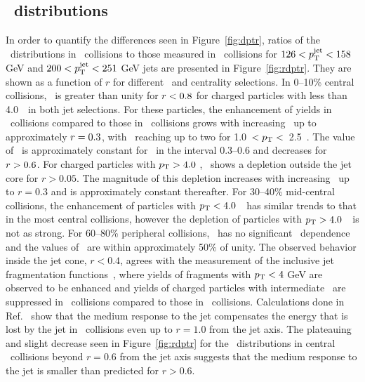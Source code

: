 \subsection{\RDptr\ distributions}
\label{sec:rdptr}
In order to quantify the differences seen in Figure~\ref{fig:dptr}, ratios of the \Dptr\ distributions in \pbpb\ collisions to those measured in \pp\ collisions for $126 < \mbox{$p_{\mathrm{T}}^{\mathrm{jet}}$} < 158$ GeV and $200 < \mbox{$p_{\mathrm{T}}^{\mathrm{jet}}$} < 251$ GeV jets are presented in Figure~\ref{fig:rdptr}.
They are shown as a function of $r$ for different \pt\ and centrality selections.
In 0--10\% central collisions, \RDptr\ is greater than unity for $\mbox{$r$} < 0.8$ for charged particles with \pT less than 4.0~\GeV\ in both jet selections.
For these particles, the enhancement of yields in \pbpb\ collisions compared to those in  \pp\ collisions grows with increasing \rvar\ up to approximately \mbox{$\mbox{$r$}  = 0.3$}, with \RDptr\ reaching up to two for 1.0~$< \mbox{$p_{\mathrm{T}}$} <$~2.5~\GeV.
The value of \RDptr\ is approximately constant for \rvar\ in the interval \mbox{0.3--0.6} and decreases for \mbox{$\mbox{$r$} > 0.6$}.
For charged particles with $\mbox{$p_{\mathrm{T}}$} > 4.0$ \GeV, \RDptr\ shows a depletion outside the jet core for $r > 0.05$.
The magnitude of this depletion increases with increasing \rvar\ up to $r = 0.3$ and is approximately constant thereafter.
For 30--40\% mid-central collisions, the enhancement of particles with $\mbox{$p_{\mathrm{T}}$} < 4.0$~\GeV\ has similar trends to that in the most central collisions, however the depletion of particles with $\mbox{$p_{\mathrm{T}}$} > 4.0$~\GeV\ is not as strong.
For 60--80\% peripheral collisions, \RDptr\ has no significant \rvar\ dependence and the values of \RDptr\ are within approximately 50\% of unity.
The observed behavior inside the jet cone, $r < 0.4$, agrees with the measurement of the inclusive jet fragmentation functions~\cite{Aaboud:2017eww, Aaboud:2017bzv, PhysRevC.98.024908}, where yields of fragments with $\mbox{$p_{\mathrm{T}}$} < 4$ GeV are observed to be enhanced and yields of charged particles with intermediate \pT\ are suppressed in \PbPb\ collisions compared to those in \pp\ collisions.
Calculations done in Ref.~\cite{Tachibana:2017syd} show that the medium response to the jet compensates the energy that is lost by the jet in \pbpb\ collisions even up to $r = 1.0$ from the jet axis.
The plateauing and slight decrease seen in Figure~\ref{fig:rdptr} for the \RDptr\ distributions in central \pbpb\ collisions beyond $r = 0.6$ from the jet axis suggests that the medium response to the jet is smaller than predicted for $r > 0.6$.


